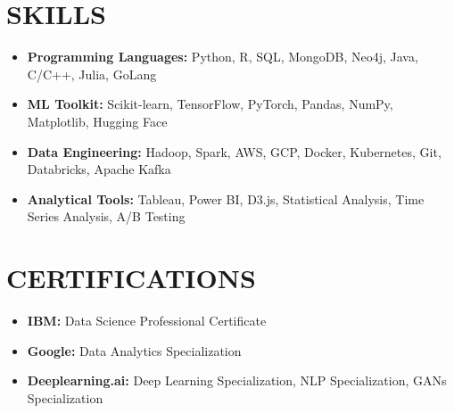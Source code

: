 \documentclass[11pt,a4paper]{article}
\begin{document}
\section*{SKILLS}
\begin{itemize}[leftmargin=*,noitemsep,topsep=0pt]
\item \textbf{Programming Languages:} Python, R, SQL, MongoDB, Neo4j, Java, C/C++, Julia, GoLang
\item \textbf{ML Toolkit:} Scikit-learn, TensorFlow, PyTorch, Pandas, NumPy, Matplotlib, Hugging Face
\item \textbf{Data Engineering:} Hadoop, Spark, AWS, GCP, Docker, Kubernetes, Git, Databricks, Apache Kafka
\item \textbf{Analytical Tools:} Tableau, Power BI, D3.js, Statistical Analysis, Time Series Analysis, A/B Testing
\end{itemize}

\section*{CERTIFICATIONS}
\begin{itemize}[leftmargin=*,noitemsep,topsep=0pt]
\item \textbf{IBM:} Data Science Professional Certificate
\item \textbf{Google:} Data Analytics Specialization
\item \textbf{Deeplearning.ai:} Deep Learning Specialization, NLP Specialization, GANs Specialization
\end{itemize}
\end{document}
